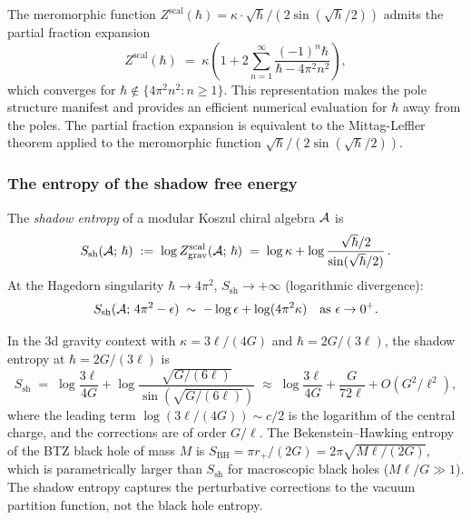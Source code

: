 \begin{remark}
The meromorphic function $Z^{\mathrm{scal}}(\hbar) = \kappa \cdot \sqrt{\hbar}/(2\sin(\sqrt{\hbar}/2))$ admits the partial fraction expansion
\begin{equation}%
Z^{\mathrm{scal}}(\hbar) \;=\; \kappa \left( 1 + 2\sum_{n=1}^{\infty} \frac{(-1)^{n} \hbar}{\hbar - 4\pi^2 n^2} \right),
\end{equation}
which converges for $\hbar \notin \{4\pi^2 n^2 : n \geq 1\}$. This representation makes the pole structure manifest and provides an efficient numerical evaluation for $\hbar$ away from the poles. The partial fraction expansion is equivalent to the Mittag-Leffler theorem applied to the meromorphic function $\sqrt{\hbar}/(2\sin(\sqrt{\hbar}/2))$.
\end{remark}

\subsubsection{The entropy of the shadow free energy}

\begin{definition}
The \emph{shadow entropy} of a modular Koszul chiral algebra $\mathcal{A}$ is
\begin{equation}%
S_{\mathrm{sh}}(\cA;\,\hbar) \;:=\; \log Z^{\mathrm{scal}}_{\mathrm{grav}}(\cA;\,\hbar) \;=\; \log\kappa + \log\frac{\sqrt{\hbar}/2}{\sin(\sqrt{\hbar}/2)}\,.
\end{equation}
At the Hagedorn singularity $\hbar \to 4\pi^2$, $S_{\mathrm{sh}} \to +\infty$ (logarithmic divergence):
\begin{equation}%
S_{\mathrm{sh}}(\cA;\,4\pi^2 - \epsilon) \;\sim\; -\log\epsilon + \log(4\pi^2\kappa) \quad\text{as } \epsilon \to 0^+.
\end{equation}
\end{definition}

\begin{remark}
In the 3d gravity context with $\kappa = 3\ell/(4G)$ and $\hbar = 2G/(3\ell)$, the shadow entropy at $\hbar = 2G/(3\ell)$ is
\[
S_{\mathrm{sh}} \;=\; \log\frac{3\ell}{4G} + \log\frac{\sqrt{G/(6\ell)}}{\sin(\sqrt{G/(6\ell)})} \;\approx\; \log\frac{3\ell}{4G} + \frac{G}{72\ell} + O(G^2/\ell^2),
\]
where the leading term $\log(3\ell/(4G)) \sim c/2$ is the logarithm of the central charge, and the corrections are of order $G/\ell$. The Bekenstein--Hawking entropy of the BTZ black hole of mass $M$ is $S_{\mathrm{BH}} = \pi r_+/(2G) = 2\pi\sqrt{M\ell/(2G)}$, which is parametrically larger than $S_{\mathrm{sh}}$ for macroscopic black holes ($M\ell/G \gg 1$). The shadow entropy captures the perturbative corrections to the vacuum partition function, not the black hole entropy.
\end{remark}

